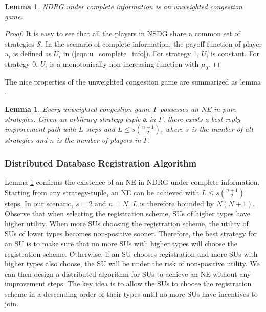 \documentclass[journal]{IEEEtran}
\newtheorem{lemma}[theorem]{Lemma}
\begin{document}
\begin{lemma}
\label{lemma:NDRG_is_CG}
NDRG under complete information is an unweighted congestion game.
\end{lemma}
\begin{proof}
It is easy to see that all the players in NSDG share a common set of strategies $\mathcal{S}$. In the scenario of complete information, the payoff function of player $u_i$ is defined as $U_i$ in (\ref{eqn:u_complete_info}). For strategy 1, $U_i$ is constant. For strategy 0, $U_i$ is a monotonically non-increasing function with $\mu_0$.
\end{proof}

The nice properties of the unweighted congestion game are summarized as lemma \cite{congestion_game}.
\begin{lemma}
\label{lemma:property_of_CG}
Every unweighted congestion game $\Gamma$ possesses an NE in pure strategies. Given an arbitrary strategy-tuple $\mathbf{a}$ in $\Gamma$, there exists a best-reply improvement path \cite{congestion_game} with $L$ steps and $L\leq s{{n+1}\choose 2}$, where $s$ is the number of all strategies and $n$ is the number of players in $\Gamma$.
\end{lemma}

\subsubsection{Distributed Database Registration Algorithm}

Lemma \ref{lemma:property_of_CG} confirms the existence of an NE in NDRG under complete information. Starting from any strategy-tuple, an NE can be achieved with $L\leq s{{n+1}\choose 2}$ steps. In our scenario, $s=2$ and $n=N$. $L$ is therefore bounded by $N(N+1)$. Observe that when selecting the registration scheme, SUs of higher types have higher utility. When more SUs choosing the registration scheme, the utility of SUs of lower types becomes non-positive sooner. Therefore, the best strategy for an SU is to make sure that no more SUs with higher types will choose the registration scheme. Otherwise, if an SU chooses registration and more SUs with higher types also choose, the SU will be under the risk of non-positive utility. We can then design a distributed algorithm for SUs to achieve an NE without any improvement steps. The key idea is to allow the SUs to choose the registration scheme in a descending order of their types until no more SUs have incentives to join.
\end{document}

